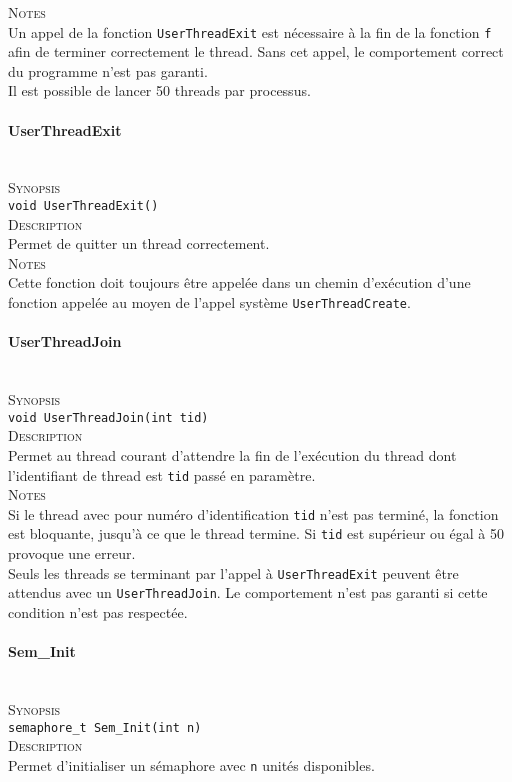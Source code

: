 \documentclass{report}
\newcommand{\myparagraph}[1]{\paragraph*{#1}\mbox{}\\}
\begin{document}
\textsc{Notes}\\
	Un appel de la fonction \texttt{UserThreadExit} est nécessaire à la fin de la fonction \texttt{f} afin de terminer correctement le thread. Sans cet appel, le comportement correct du programme n'est pas garanti.\\
	Il est possible de lancer 50 threads par processus.

\myparagraph{UserThreadExit}

\textsc{Synopsis}\\
	\texttt{void UserThreadExit()}\\
	
\textsc{Description}\\
	Permet de quitter un thread correctement.\\
	
\textsc{Notes}\\
	Cette fonction doit toujours être appelée dans un chemin d’exécution d'une fonction appelée au moyen de l'appel système \texttt{UserThreadCreate}.
	

\myparagraph{UserThreadJoin}

\textsc{Synopsis}\\
	\texttt{void UserThreadJoin(int tid)}\\
	
\textsc{Description}\\
	Permet au thread courant d'attendre la fin de l'exécution du thread dont l'identifiant de thread est \texttt{tid} passé en paramètre.\\
	
\textsc{Notes}\\
	Si le thread avec pour numéro d'identification \texttt{tid} n'est pas terminé, la fonction est bloquante, jusqu'à ce que le thread termine. Si \texttt{tid} est supérieur ou égal à 50 provoque une erreur.\\
Seuls les threads se terminant par l'appel à \texttt{UserThreadExit} peuvent être attendus avec un \texttt{UserThreadJoin}. Le comportement n'est pas garanti si cette condition n'est pas respectée.


\myparagraph{Sem\_Init}
	
	\textsc{Synopsis}\\
		\texttt{semaphore\_t Sem\_Init(int n)}\\

\textsc{Description}\\
	Permet d'initialiser un sémaphore avec \texttt{n} unités disponibles.\\
	
\end{document}
